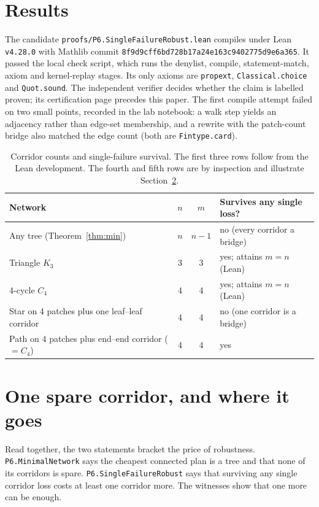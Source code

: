 \documentclass[11pt]{article}
\begin{document}
\section{Results}
The candidate \texttt{proofs/P6.SingleFailureRobust.lean} compiles under Lean \texttt{v4.28.0} with Mathlib
commit \texttt{8f9d9cff6bd728b17a24e163c9402775d9e6a365}. It passed the local check script, which runs the
denylist, compile, statement-match, axiom and kernel-replay stages. Its only axioms are \texttt{propext},
\texttt{Classical.choice} and \texttt{Quot.sound}. The independent verifier decides whether the claim is
labelled proven; its certification page precedes this paper. The first compile attempt failed on two small
points, recorded in the lab notebook: a walk step yields an adjacency rather than edge-set membership, and
a rewrite with the patch-count bridge also matched the edge count (both are \texttt{Fintype.card}).

\begin{table}[h]
\centering
\begin{tabular}{lccl}
\toprule
Network & $n$ & $m$ & Survives any single loss?\\
\midrule
Any tree (Theorem~\ref{thm:min}) & $n$ & $n-1$ & no (every corridor a bridge)\\
Triangle $K_3$ & 3 & 3 & yes; attains $m=n$ (Lean)\\
4-cycle $C_4$ & 4 & 4 & yes; attains $m=n$ (Lean)\\
Star on 4 patches plus one leaf--leaf corridor & 4 & 4 & no (one corridor is a bridge)\\
Path on 4 patches plus end--end corridor ($=C_4$) & 4 & 4 & yes\\
\bottomrule
\end{tabular}
\caption{Corridor counts and single-failure survival. The first three rows follow from the Lean
development. The fourth and fifth rows are by inspection and illustrate Section~\ref{sec:placement}.}
\label{tab:examples}
\end{table}

\section{One spare corridor, and where it goes}\label{sec:placement}
Read together, the two statements bracket the price of robustness. \texttt{P6.MinimalNetwork} says the
cheapest connected plan is a tree and that none of its corridors is spare. \texttt{P6.SingleFailureRobust}
says that surviving any single corridor loss costs at least one corridor more. The witnesses show that one
more can be enough.
\end{document}
